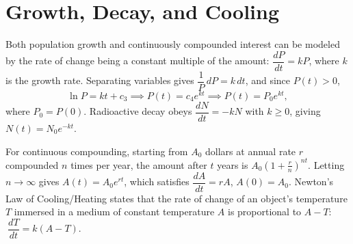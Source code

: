 \documentclass[10pt]{article}
\begin{document}
\section{Growth, Decay, and Cooling}

Both population growth and continuously compounded interest can be modeled by the rate of
change being a constant multiple of the amount: \(\dfrac{dP}{dt} = kP\), where \(k\) is the
growth rate. Separating variables gives \(\dfrac{1}{P}\,dP = k\,dt\), and since \(P(t) > 0\),
\[
    \ln P = kt + c_3 \implies P(t) = c_4 e^{kt} \implies P(t) = P_0 e^{kt},
\]
where \(P_0 = P(0)\). Radioactive decay obeys \(\dfrac{dN}{dt} = -kN\) with \(k \geq 0\), giving
\(N(t) = N_0 e^{-kt}\).

\begin{note}
    For continuous compounding, starting from \(A_0\) dollars at annual rate \(r\) compounded
    \(n\) times per year, the amount after \(t\) years is \(A_0\left(1 + \tfrac{r}{n}\right)^{nt}\).
    Letting \(n \to \infty\) gives \(A(t) = A_0 e^{rt}\), which satisfies \(\dfrac{dA}{dt} = rA\),
    \(A(0) = A_0\). Newton's Law of Cooling/Heating states that the rate of change of an object's
    temperature \(T\) immersed in a medium of constant temperature \(A\) is proportional to
    \(A - T\): \(\ \dfrac{dT}{dt} = k(A - T)\).
\end{note}
\end{document}
